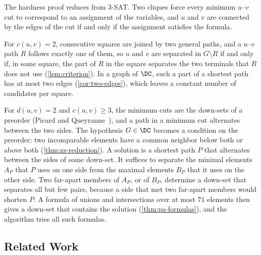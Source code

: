 The hardness proof reduces from 3-SAT.
Two cliques force every minimum $u$--$v$ cut to correspond to an assignment of the variables, and $u$ and $v$ are connected by the edges of the cut if and only if the assignment satisfies the formula.

For $c(u, v) = 2$, consecutive squares are joined by two general paths, and a $u$--$v$ path $R$ follows exactly one of them, so $u$ and $v$ are separated in $G \setminus R$ if and only if, in some square, the part of $R$ in the square separates the two terminals that $R$ does not use (\cref{lem:criterion}).
In a graph of $\DC$, such a part of a shortest path has at most two edges (\cref{cor:two-edges}), which leaves a constant number of candidates per square.

For $d(u, v) = 2$ and $c(u, v) \geq 3$, the minimum cuts are the down-sets of a preorder (Picard and Queyranne~\cite{PicardQueyranne1980}), and a path in a minimum cut alternates between the two sides.
The hypothesis $G \in \DC$ becomes a condition on the preorder: two incomparable elements have a common neighbor below both or above both (\cref{thm:zz-reduction}).
A solution is a shortest path $P$ that alternates between the sides of some down-set.
It suffices to separate the minimal elements $A_P$ that $P$ uses on one side from the maximal elements $B_P$ that it uses on the other side.
Two far-apart members of $A_P$, or of $B_P$, determine a down-set that separates all but few pairs, because a side that met two far-apart members would shorten $P$.
A formula of unions and intersections over at most $71$ elements then gives a down-set that contains the solution (\cref{thm:pa-formulas}), and the algorithm tries all such formulas.

\subsection{Related Work}\label{sec:related-work}

